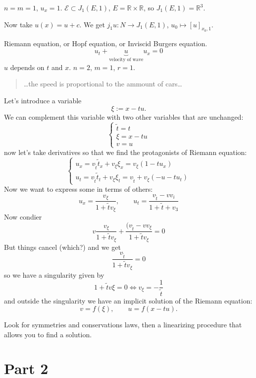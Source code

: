 \begin{example}\leavevmode
$n=m=1$, $u_x=1$. $\mathcal{E}\subset J_1(E,1)$, $E= \mathbb{R} \times \mathbb{R}$, so $J_1(E,1)=\mathbb{R}^3$.

Now take $u(x)=u+c$. We get  $j_1u:N \to J_1(E,1)$, $ u_0 \mapsto [u]_{x_0,1}$.
\end{example}

\begin{example}\leavevmode
	Riemann equation, or Hopf equation, or Inviscid Burgers equation.
	\[u_t+\underbrace{u}_{\text{velocity of wave} } u_x=0\]
	$u$ depends on $t$ and $x$. $n=2$,  $m=1$,  $r=1$.

\begin{quotation}
	…the speed is proportional to the ammount of cars…
\end{quotation}
Let's introduce a variable
\[\xi:=x-tu.\]
We can complement this variable with two other variables that are unchanged:
\[\begin{cases}
	\tilde{t}=t\\
	\xi=x-tu\\
	v=u
\end{cases}\]
now let's take derivatives so that we find the protagonists of Riemann equation:
\[\begin{cases}
	u_x=v_{\tilde{t}}\tilde{t}_x+v_\xi \xi_x=v_\xi(1-tu_x)\\
u_t=v_{\tilde{t}}\tilde{t}_t+v_\xi \xi_t=v_{\tilde{t}}+v_\xi(-u-tu_t)
\end{cases}\]
Now we want to express some in terms of others:
 \[u_x=\frac{v_\xi}{1+\tilde{t}v_\xi},\qquad  u_t=\frac{v_{\tilde{t}}-v v_i}{1+\tilde{t}+v_3}\]
 Now condier
 \[v\frac{v_\xi}{1+\tilde{t}v_\xi}+\frac{(v_{\tilde{t}}-v v_\xi}{1+\tilde{t}v_\xi}=0\]
 But things cancel (which?) and we get
 \[\frac{v_{\tilde{t}}}{1+\tilde{t}v_\xi}=0\]
 so we have a singularity given by
 \[1+\tilde{t}v\xi=0 \iff v_\xi=-\frac{1}{\tilde{t}}\]
 and outside the singularity we have an implicit solution of the Riemann equation:
 \[v=f(\xi),\qquad u=f(x-tu).\]
\end{example}

\begin{upshot}\leavevmode
	Look for symmetries and conservations laws, then a linearizing procedure that allows you to find a solution.
\end{upshot}

\section{Part 2}

